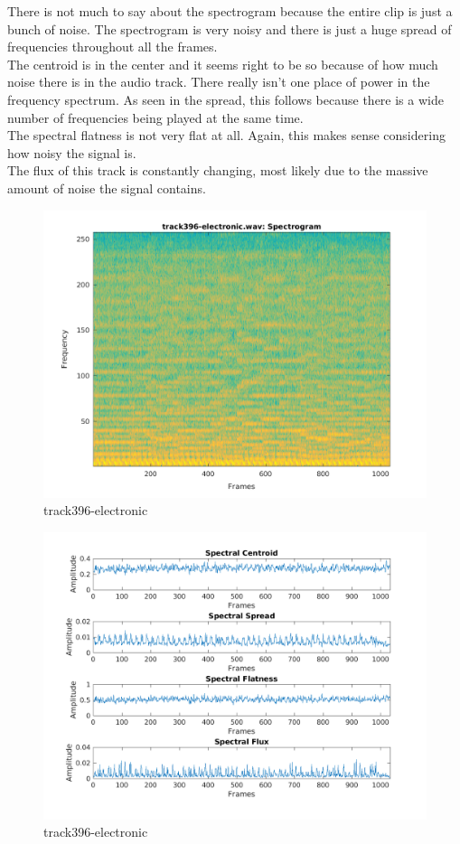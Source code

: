 \documentclass[11pt, a4paper]{article}
\begin{document}
There is not much to say about the spectrogram because the entire clip is just a bunch of noise. The spectrogram is very noisy and there is just a huge spread of frequencies throughout all the frames. \\

The centroid is in the center and it seems right to be so because of how much noise there is in the audio track. There really isn't one place of power in the frequency spectrum. As seen in the spread, this follows because there is a wide number of frequencies being played at the same time. \\

The spectral flatness is not very flat at all. Again, this makes sense considering how noisy the signal is. \\

The flux of this track is constantly changing, most likely due to the massive amount of noise the signal contains. \\

\pagebreak

\begin{figure}[H]
    \centering
    \includegraphics[width=.75\textwidth]{track396-electronic-specto.png}
    \caption{track396-electronic}
\end{figure}


\begin{figure}[H]
    \centering
    \includegraphics[width=\textwidth]{track396-electronic-spectral.png}
    \caption{track396-electronic}
\end{figure}
\end{document}

